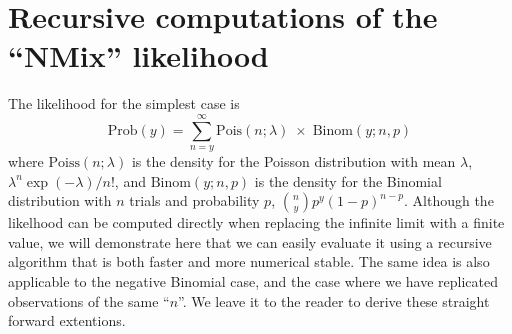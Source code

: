 \documentclass[a4paper,11pt]{article}
\begin{document}
\appendix
\section{Recursive computations of the ``NMix'' likelihood}

The likelihood for the simplest case is
\begin{displaymath}
    \text{Prob}(y) = \sum_{n = y}^{\infty}
    \text{Pois}(n ; \lambda) \;\times\; \text{Binom}(y;  n, p)
\end{displaymath}
where $\text{Poiss}(n; \lambda)$ is the density for the Poisson
distribution with mean $\lambda$, $\lambda^{n}\exp(-\lambda)/n!$, and
$\text{Binom}(y; n, p)$ is the density for the Binomial distribution
with $n$ trials and probability $p$, ${n \choose y} p^{y}(1-p)^{n-p}$.
Although the likelhood can be computed directly when replacing the
infinite limit with a finite value, we will demonstrate here that we
can easily evaluate it using a recursive algorithm that is both faster
and more numerical stable. The same idea is also applicable to the
negative Binomial case, and the case where we have replicated
observations of the same ``$n$''. We leave it to the reader to derive
these straight forward extentions.
\end{document}
